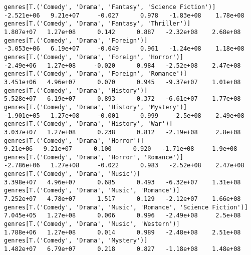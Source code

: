 \documentclass[11pt]{article}
\begin{document}
\begin{Verbatim}[commandchars=\\\{\}]
genres[T.('Comedy', 'Drama', 'Fantasy', 'Science Fiction')]                                                  -2.521e+06   9.21e+07     -0.027      0.978   -1.83e+08    1.78e+08
genres[T.('Comedy', 'Drama', 'Fantasy', 'Thriller')]                                                          1.807e+07   1.27e+08      0.142      0.887   -2.32e+08    2.68e+08
genres[T.('Comedy', 'Drama', 'Foreign')]                                                                     -3.053e+06   6.19e+07     -0.049      0.961   -1.24e+08    1.18e+08
genres[T.('Comedy', 'Drama', 'Foreign', 'Horror')]                                                            -2.49e+06   1.27e+08     -0.020      0.984   -2.52e+08    2.47e+08
genres[T.('Comedy', 'Drama', 'Foreign', 'Romance')]                                                           3.451e+06   4.96e+07      0.070      0.945   -9.37e+07    1.01e+08
genres[T.('Comedy', 'Drama', 'History')]                                                                      5.528e+07   6.19e+07      0.893      0.372   -6.61e+07    1.77e+08
genres[T.('Comedy', 'Drama', 'History', 'Mystery')]                                                          -1.901e+05   1.27e+08     -0.001      0.999    -2.5e+08    2.49e+08
genres[T.('Comedy', 'Drama', 'History', 'War')]                                                               3.037e+07   1.27e+08      0.238      0.812   -2.19e+08     2.8e+08
genres[T.('Comedy', 'Drama', 'Horror')]                                                                        9.21e+06   9.21e+07      0.100      0.920   -1.71e+08     1.9e+08
genres[T.('Comedy', 'Drama', 'Horror', 'Romance')]                                                           -2.786e+06   1.27e+08     -0.022      0.983   -2.52e+08    2.47e+08
genres[T.('Comedy', 'Drama', 'Music')]                                                                        3.398e+07   4.96e+07      0.685      0.493   -6.32e+07    1.31e+08
genres[T.('Comedy', 'Drama', 'Music', 'Romance')]                                                             7.252e+07   4.78e+07      1.517      0.129   -2.12e+07    1.66e+08
genres[T.('Comedy', 'Drama', 'Music', 'Romance', 'Science Fiction')]                                          7.045e+05   1.27e+08      0.006      0.996   -2.49e+08     2.5e+08
genres[T.('Comedy', 'Drama', 'Music', 'Western')]                                                             1.788e+06   1.27e+08      0.014      0.989   -2.48e+08    2.51e+08
genres[T.('Comedy', 'Drama', 'Mystery')]                                                                      1.482e+07   6.79e+07      0.218      0.827   -1.18e+08    1.48e+08

\end{Verbatim}
\end{document}
